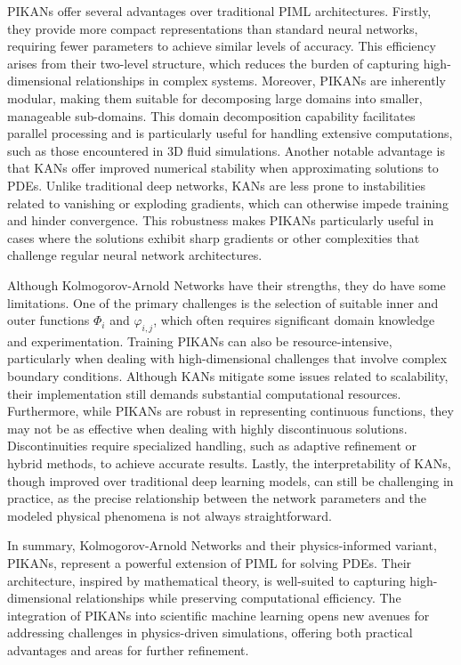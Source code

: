 PIKANs offer several advantages over traditional PIML architectures. Firstly, they provide more compact representations than standard neural networks, requiring fewer parameters to achieve similar levels of accuracy. This efficiency arises from their two-level structure, which reduces the burden of capturing high-dimensional relationships in complex systems. Moreover, PIKANs are inherently modular, making them suitable for decomposing large domains into smaller, manageable sub-domains. This domain decomposition capability facilitates parallel processing and is particularly useful for handling extensive computations, such as those encountered in 3D fluid simulations. Another notable advantage is that KANs offer improved numerical stability when approximating solutions to PDEs. Unlike traditional deep networks, KANs are less prone to instabilities related to vanishing or exploding gradients, which can otherwise impede training and hinder convergence. This robustness makes PIKANs particularly useful in cases where the solutions exhibit sharp gradients or other complexities that challenge regular neural network architectures.

Although Kolmogorov-Arnold Networks have their strengths, they do have some limitations. One of the primary challenges is the selection of suitable inner and outer functions \( \Phi_i \) and \( \varphi_{i,j} \), which often requires significant domain knowledge and experimentation. Training PIKANs can also be resource-intensive, particularly when dealing with high-dimensional challenges that involve complex boundary conditions. Although KANs mitigate some issues related to scalability, their implementation still demands substantial computational resources. Furthermore, while PIKANs are robust in representing continuous functions, they may not be as effective when dealing with highly discontinuous solutions. Discontinuities require specialized handling, such as adaptive refinement or hybrid methods, to achieve accurate results. Lastly, the interpretability of KANs, though improved over traditional deep learning models, can still be challenging in practice, as the precise relationship between the network parameters and the modeled physical phenomena is not always straightforward.

In summary, Kolmogorov-Arnold Networks and their physics-informed variant, PIKANs, represent a powerful extension of PIML for solving PDEs. Their architecture, inspired by mathematical theory, is well-suited to capturing high-dimensional relationships while preserving computational efficiency. The integration of PIKANs into scientific machine learning opens new avenues for addressing challenges in physics-driven simulations, offering both practical advantages and areas for further refinement.

